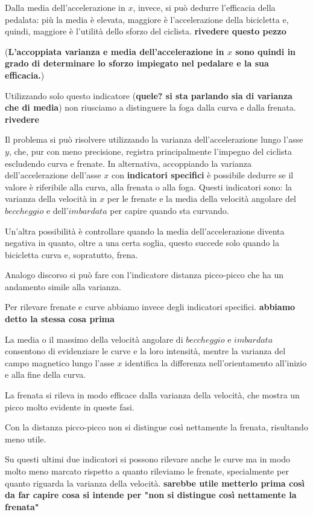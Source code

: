 \documentclass[12pt]{article}
\begin{document}
	Dalla media dell'accelerazione in \(x\), invece, si può dedurre l'efficacia della pedalata: più la media è elevata, maggiore è l'accelerazione della bicicletta e, quindi, maggiore è l'utilità dello sforzo del ciclista. \textbf{rivedere questo pezzo}
	
	(\textbf{L'accoppiata varianza e media dell'accelerazione in \(x\) sono quindi in grado di determinare lo sforzo impiegato nel pedalare e la sua efficacia.})
	
	Utilizzando solo questo indicatore (\textbf{quele? si sta parlando sia di varianza che di media}) non riusciamo a distinguere la foga dalla curva e dalla frenata. \textbf{rivedere}
	
	Il problema si può risolvere utilizzando la varianza dell'accelerazione lungo l'asse \(y\), che, pur con meno precisione, registra principalmente l'impegno del ciclista escludendo curva e frenate. In alternativa, accoppiando la varianza dell'accelerazione dell'asse \(x\) con \textbf{indicatori specifici} è possibile dedurre se il valore è riferibile alla curva, alla frenata o alla foga. Questi indicatori sono: la varianza della velocità in \(x\) per le frenate e la media della velocità angolare del \(beccheggio\) e dell'\(imbardata\) per capire quando sta curvando.
	
	Un'altra possibilità è controllare quando la media dell'accelerazione diventa negativa in quanto, oltre a una certa soglia, questo succede solo quando la bicicletta curva e, sopratutto, frena.
	
	Analogo discorso si può fare con l'indicatore distanza picco-picco che ha un andamento simile alla varianza.\hfill\break
	
	Per rilevare frenate e curve abbiamo invece degli indicatori specifici. \textbf{abbiamo detto la stessa cosa prima}
	
	La media o il massimo della velocità angolare di \(beccheggio\) e \(imbardata\) consentono di evidenziare le curve e la loro intensità, mentre la varianza del campo magnetico lungo l'asse \(x\) identifica la differenza nell'orientamento all'inizio e alla fine della curva.
	
	La frenata si rileva in modo efficace dalla varianza della velocità, che mostra un picco molto evidente in queste fasi.
	
	Con la distanza picco-picco non si distingue così nettamente la frenata, risultando meno utile.
	
	Su questi ultimi due indicatori si possono rilevare anche le curve ma in modo molto meno marcato rispetto a quanto rileviamo le frenate, specialmente per quanto riguarda la varianza della velocità. \textbf{sarebbe utile metterlo prima così da far capire cosa si intende per "non si distingue così nettamente la frenata"}
	
	
\end{document}
